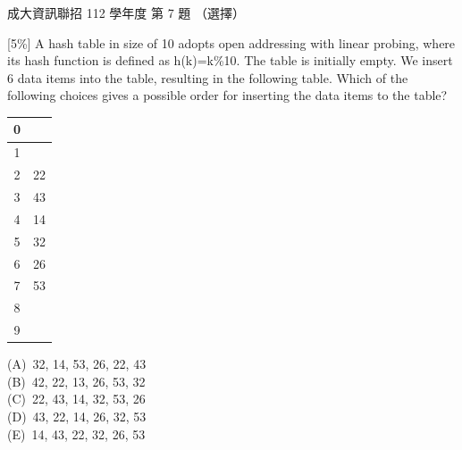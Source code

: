 \begin{pastexam}[label={px:ncku-112-prog-07}]{成大資訊聯招 112 學年度 第 7 題}
（選擇）

{[5\%]} A hash table in size of 10 adopts open addressing with linear probing, where its hash function
is defined as h(k)=k\%10. The table is initially empty. We insert 6 data items into the table, resulting
in the following table. Which of the following choices gives a possible order for inserting the data
items to the table?
\begin{center}
\begin{tabular}{|c|c|}
\hline
0 & \\ \hline
1 & \\ \hline
2 & 22 \\ \hline
3 & 43 \\ \hline
4 & 14 \\ \hline
5 & 32 \\ \hline
6 & 26 \\ \hline
7 & 53 \\ \hline
8 & \\ \hline
9 & \\ \hline
\end{tabular}
\end{center}
(A)~32, 14, 53, 26, 22, 43\\
(B)~42, 22, 13, 26, 53, 32\\
(C)~22, 43, 14, 32, 53, 26\\
(D)~43, 22, 14, 26, 32, 53\\
(E)~14, 43, 22, 32, 26, 53
\end{pastexam}

